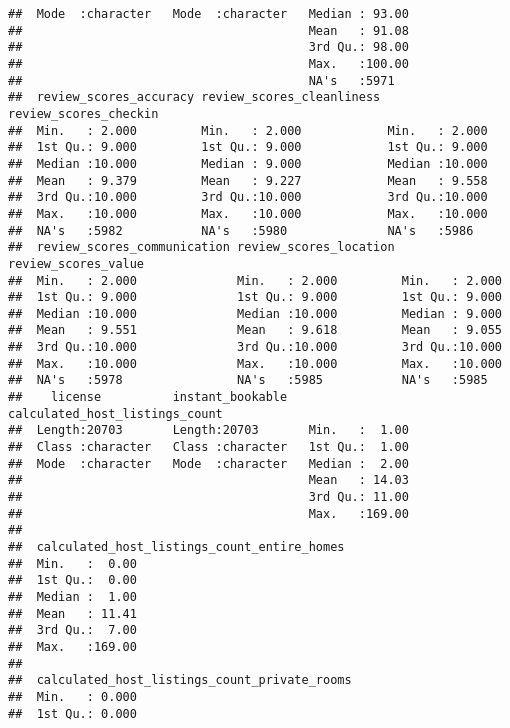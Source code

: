 \begin{verbatim}
##  Mode  :character   Mode  :character   Median : 93.00      
##                                        Mean   : 91.08      
##                                        3rd Qu.: 98.00      
##                                        Max.   :100.00      
##                                        NA's   :5971        
##  review_scores_accuracy review_scores_cleanliness review_scores_checkin
##  Min.   : 2.000         Min.   : 2.000            Min.   : 2.000       
##  1st Qu.: 9.000         1st Qu.: 9.000            1st Qu.: 9.000       
##  Median :10.000         Median : 9.000            Median :10.000       
##  Mean   : 9.379         Mean   : 9.227            Mean   : 9.558       
##  3rd Qu.:10.000         3rd Qu.:10.000            3rd Qu.:10.000       
##  Max.   :10.000         Max.   :10.000            Max.   :10.000       
##  NA's   :5982           NA's   :5980              NA's   :5986         
##  review_scores_communication review_scores_location review_scores_value
##  Min.   : 2.000              Min.   : 2.000         Min.   : 2.000     
##  1st Qu.: 9.000              1st Qu.: 9.000         1st Qu.: 9.000     
##  Median :10.000              Median :10.000         Median : 9.000     
##  Mean   : 9.551              Mean   : 9.618         Mean   : 9.055     
##  3rd Qu.:10.000              3rd Qu.:10.000         3rd Qu.:10.000     
##  Max.   :10.000              Max.   :10.000         Max.   :10.000     
##  NA's   :5978                NA's   :5985           NA's   :5985       
##    license          instant_bookable   calculated_host_listings_count
##  Length:20703       Length:20703       Min.   :  1.00                
##  Class :character   Class :character   1st Qu.:  1.00                
##  Mode  :character   Mode  :character   Median :  2.00                
##                                        Mean   : 14.03                
##                                        3rd Qu.: 11.00                
##                                        Max.   :169.00                
##                                                                      
##  calculated_host_listings_count_entire_homes
##  Min.   :  0.00                             
##  1st Qu.:  0.00                             
##  Median :  1.00                             
##  Mean   : 11.41                             
##  3rd Qu.:  7.00                             
##  Max.   :169.00                             
##                                             
##  calculated_host_listings_count_private_rooms
##  Min.   : 0.000                              
##  1st Qu.: 0.000                              

\end{verbatim}
